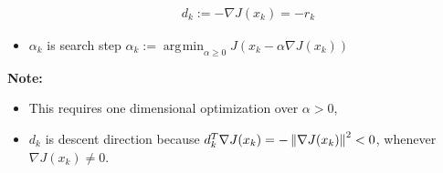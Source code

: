 \documentclass[amstex]{beamer}
\DeclareMathOperator*{\argmin}{\arg\!\min}
\begin{document}
\begin{CJK*}{GBK}{kai}
\begin{frame}
\begin{itemize}
		\begin{eqnarray*}
			d_k := -\nabla J(x_{k})=-r_k
		\end{eqnarray*}
		\item $\alpha_k$ is search step 
		$\alpha_k :=\argmin_{\alpha\geq 0}  J(x_{k}-\alpha\nabla J(x_{k}))$
	\end{itemize}
	{\bf Note:}
	\begin{itemize}
		\item This requires one dimensional optimization over $\alpha>0$,
		\item $d_k$ is descent direction because $d_k^T\nabla J(x_{k})=-\left\|\nabla J(x_{k})\right\|^2<0$, whenever $\nabla J(x_{k})\neq 0$.
	\end{itemize}
\end{frame}


\end{CJK*}
\end{document}
